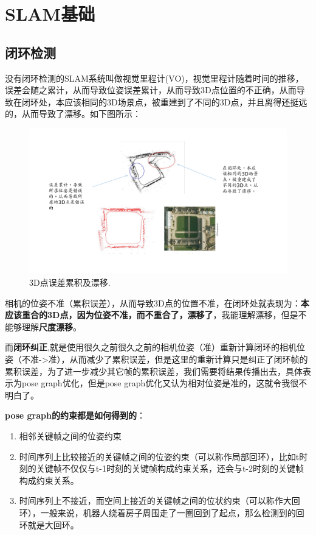 
\chapter{SLAM基础}
\section{闭环检测}
没有闭环检测的SLAM系统叫做视觉里程计(VO)，视觉里程计随着时间的推移，误差会随之累计，从而导致位姿误差累计，从而导致3D点位置的不正确，从而导致在闭环处，本应该相同的3D场景点，被重建到了不同的3D点，并且离得还挺远的，从而导致了漂移。如下图所示：

\begin{figure}[h]%
	\centering  %
	\includegraphics[width=1.0\linewidth]{image/drift.pdf}  %
	\caption{3D点误差累积及漂移.}  %
	\label{fig:tracking}   %
\end{figure}


相机的位姿不准（累积误差），从而导致3D点的位置不准，在闭环处就表现为：\textbf{本应该重合的3D点，因为位姿不准，而不重合了，漂移了}，我能理解漂移，但是不能够理解\textbf{尺度漂移}。

而\textbf{闭环纠正},就是使用很久之前很久之前的相机位姿（准）重新计算闭环的相机位姿（不准->准），从而减少了累积误差，但是这里的重新计算只是纠正了闭环帧的累积误差，为了进一步减少其它帧的累积误差，我们需要将结果传播出去，具体表示为pose graph优化，但是pose graph优化又认为相对位姿是准的，这就令我很不明白了。




\textbf{pose graph的约束都是如何得到的}：
\begin{enumerate}
	\item 相邻关键帧之间的位姿约束
	\item 时间序列上比较接近的关键帧之间的位姿约束（可以称作局部回环），比如t时刻的关键帧不仅仅与t-1时刻的关键帧构成约束关系，还会与t-2时刻的关键帧构成约束关系。
	\item  时间序列上不接近，而空间上接近的关键帧之间的位状约束（可以称作大回环），一般来说，机器人绕着房子周围走了一圈回到了起点，那么检测到的回环就是大回环。
\end{enumerate}





